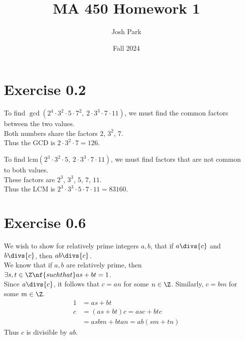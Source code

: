 \documentclass{article}
\author{Josh Park}
\date{\vspace*{-1em}Fall 2024}
\title{\vspace*{-2em}MA 450 Homework 1 \vspace*{-1em}}
\begin{document}
\maketitle
\section*{Exercise 0.2}
To find \(\gcd(2^4\cdot 3^2\cdot 5\cdot 7^2,\ 2\cdot 3^3\cdot 7\cdot 11)\), we must find the common factors between the two values. \\
Both numbers share the factors \(2\), \(3^2\), \(7\). \\
Thus the GCD is \(2\cdot 3^2\cdot 7=126\).

To find \(\text{lcm}(2^3\cdot 3^2\cdot 5,\ 2\cdot 3^3\cdot 7\cdot 11)\), we must find factors that are not common to both values. \\
These factors are \(2^3\), \(3^3\), \(5\), \(7\), \(11\). \\
Thus the LCM is \(2^3\cdot 3^3\cdot 5\cdot 7\cdot 11=83160\).

\section*{Exercise 0.6}
We wish to show for relatively prime integers \(a, b\), that  if \({a}\divs{c}\) and \({b}\divs{c}\), then \({ab}\divs{c}\). \\
We know that if \(a,b\) are relatively prime, then \(\exists s,t \in \Z \nf{ such that } as+bt=1\). \\
Since \({a}\divs{c}\), it follows that \(c=an\) for some \(n\in\Z\). Similarly, \(c=bm\) for some \(m\in\Z\).
\begin{align}
    1 &= as + bt  \\
    c &= (as + bt)c = asc + btc \\
    &= asbm + btan = ab(sm + tn)
\end{align}
Thus \(c\) is divisible by \(ab\).
\end{document}
